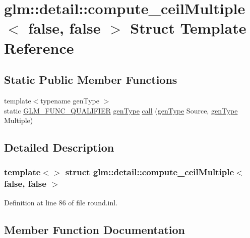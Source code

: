 \hypertarget{structglm_1_1detail_1_1compute__ceil_multiple_3_01false_00_01false_01_4}{}\section{glm\+::detail\+::compute\+\_\+ceil\+Multiple$<$ false, false $>$ Struct Template Reference}
\label{structglm_1_1detail_1_1compute__ceil_multiple_3_01false_00_01false_01_4}
\subsection*{Static Public Member Functions}
\begin{DoxyCompactItemize}
\item 
{\footnotesize template$<$typename gen\+Type $>$ }\\static \mbox{\hyperlink{setup_8hpp_a33fdea6f91c5f834105f7415e2a64407}{G\+L\+M\+\_\+\+F\+U\+N\+C\+\_\+\+Q\+U\+A\+L\+I\+F\+I\+ER}} \mbox{\hyperlink{structglm_1_1detail_1_1gen_type}{gen\+Type}} \mbox{\hyperlink{structglm_1_1detail_1_1compute__ceil_multiple_3_01false_00_01false_01_4_a42251f23ffbe25b624948a1128aa9957}{call}} (\mbox{\hyperlink{structglm_1_1detail_1_1gen_type}{gen\+Type}} Source, \mbox{\hyperlink{structglm_1_1detail_1_1gen_type}{gen\+Type}} Multiple)
\end{DoxyCompactItemize}


\subsection{Detailed Description}
\subsubsection*{template$<$$>$\newline
struct glm\+::detail\+::compute\+\_\+ceil\+Multiple$<$ false, false $>$}



Definition at line 86 of file round.\+inl.



\subsection{Member Function Documentation}
\mbox{\label{structglm_1_1detail_1_1compute__ceil_multiple_3_01false_00_01false_01_4_a42251f23ffbe25b624948a1128aa9957}} 
